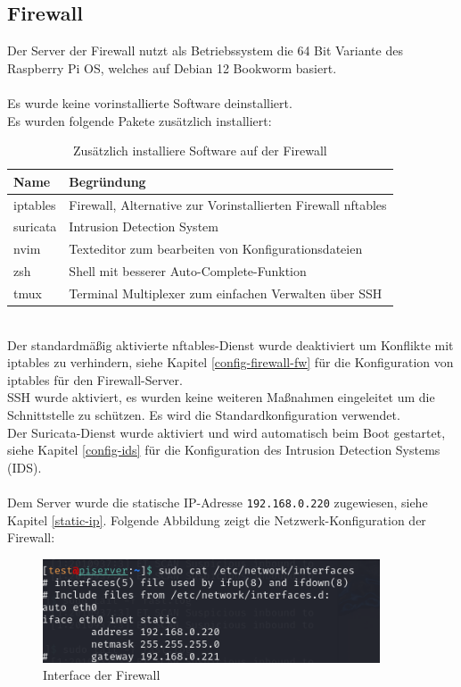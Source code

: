 \documentclass[
    a4paper,
    pagesize,
	pdftex,
    12pt,
]{scrartcl}
\begin{document}
\subsection{Firewall}
Der Server der Firewall nutzt als Betriebssystem die 64 Bit Variante des Raspberry Pi OS, welches auf Debian 12 Bookworm basiert. 
\\ \\
Es wurde keine vorinstallierte  Software deinstalliert. 
\\
Es wurden folgende Pakete zusätzlich installiert:
\begin{table}[h!]
	\begin{center}
		\label{tab:table1}
		\begin{tabular}{l|l }
			\textbf{Name} & \textbf{Begründung} \\
			\hline
			iptables & Firewall, Alternative zur Vorinstallierten Firewall nftables \\
			suricata & Intrusion Detection System \\
			nvim & Texteditor zum bearbeiten von Konfigurationsdateien \\
			zsh & Shell mit besserer Auto-Complete-Funktion \\
			tmux & Terminal Multiplexer zum einfachen Verwalten über SSH \\
		\end{tabular}
		\caption{Zusätzlich installiere Software auf der Firewall}
	\end{center}
\end{table}
\\
Der standardmäßig aktivierte nftables-Dienst wurde deaktiviert um Konflikte mit iptables zu verhindern, siehe Kapitel \ref{config-firewall-fw} für die Konfiguration von iptables für den Firewall-Server. \\
SSH wurde aktiviert, es wurden keine weiteren Maßnahmen eingeleitet um die Schnittstelle zu  schützen. Es wird die Standardkonfiguration verwendet. \\
Der Suricata-Dienst wurde aktiviert und wird automatisch beim Boot gestartet, siehe Kapitel \ref{config-ids} für die Konfiguration des Intrusion Detection Systems (IDS). \\ \\
Dem Server wurde die statische IP-Adresse \lstinline[breaklines]|192.168.0.220| zugewiesen, siehe Kapitel \ref{static-ip}. Folgende Abbildung zeigt die Netzwerk-Konfiguration der Firewall:

\begin{figure}[!ht]
	\centering
	\includegraphics[width=10cm]{interface-firewall.png}
	\caption{Interface der Firewall}
	\label{fig:interface-firewall}
\end{figure}
\end{document}
